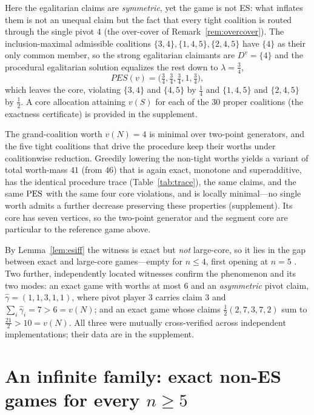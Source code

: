 Here the egalitarian claims are \emph{symmetric}, yet the game is not ES: what
inflates them is not an unequal claim but the fact that every tight coalition is
routed through the single pivot $4$ (the over-cover of
Remark~\ref{rem:overcover}). The inclusion-maximal admissible coalitions
$\{3,4\},\{1,4,5\},\{2,4,5\}$ have $\{4\}$ as their only common member, so the
strong egalitarian claimants are $D^{v}=\{4\}$ and the procedural egalitarian
solution equalizes the rest down to $\lambda=\tfrac34$,
\[
  PES(v)=\bigl(\tfrac34,\tfrac34,\tfrac34,1,\tfrac34\bigr),
\]
which leaves the core, violating $\{3,4\}$ and $\{4,5\}$ by $\tfrac14$ and
$\{1,4,5\}$ and $\{2,4,5\}$ by $\tfrac12$. A core allocation attaining $v(S)$ for
each of the $30$ proper coalitions (the exactness certificate) is provided in the
supplement.

\begin{remark}\label{rem:minmass}
The grand-coalition worth $v(N)=4$ is minimal over two-point generators, and the
five tight coalitions that drive the procedure keep their worths under
coalitionwise reduction. Greedily lowering the non-tight worths yields a variant of
total worth-mass $41$ (from $46$) that is again exact, monotone and superadditive,
has the identical procedure trace (Table~\ref{tab:trace}), the same claims, and the
same $\operatorname{PES}$ with the same four core violations, and is locally minimal---no single
worth admits a further decrease preserving these properties (supplement). Its core
has seven vertices, so the two-point generator and the segment core are particular
to the reference game above.
\end{remark}

\begin{remark}\label{rem:notlarge}
By Lemma~\ref{lem:esiff} the witness is exact but \emph{not} large-core, so it
lies in the gap between exact and large-core games---empty for $n\le4$, first
opening at $n=5$ \citep{Biswas1999}. Two further, independently located witnesses confirm
the phenomenon and its two modes: an exact game with worths at most $6$ and an
\emph{asymmetric} pivot claim, $\widehat\gamma=(1,1,3,1,1)$, where pivot player
$3$ carries claim $3$ and $\sum_i\widehat\gamma_i=7>6=v(N)$; and an exact game
whose claims $\tfrac12(2,7,3,7,2)$ sum to $\tfrac{21}{2}>10=v(N)$. All three were
mutually cross-verified across independent implementations; their data are in the
supplement.
\end{remark}


\section{An infinite family: exact non-ES games for every $n\ge5$}
\label{sec:family}

